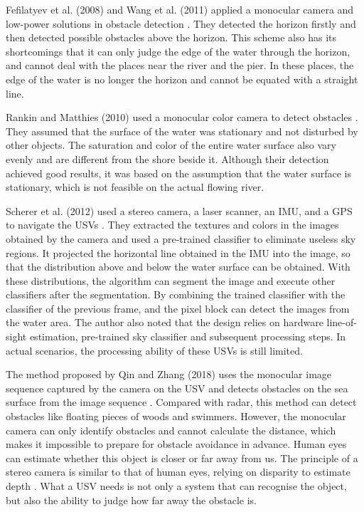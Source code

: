 \documentclass[journal,article,submit,moreauthors,pdftex]{Definitions/mdpi}
\begin{document}
Fefilatyev et al. (2008) and Wang et al. (2011) applied a monocular camera and low-power solutions in obstacle detection \cite{4761344, 6070512}. They detected the horizon firstly and then detected possible obstacles above the horizon. This scheme also has its shortcomings that it can only judge the edge of the water through the horizon, and cannot deal with the places near the river and the pier. In these places, the edge of the water is no longer the horizon and cannot be equated with a straight line.

Rankin and Matthies (2010) used a monocular color camera to detect obstacles \cite{5650402}. They assumed that the surface of the water was stationary and not disturbed by other objects. The saturation and color of the entire water surface also vary evenly and are different from the shore beside it.
Although their detection achieved good results, it was based on the assumption that the water surface is stationary, which is not feasible on the actual flowing river.

Scherer et al. (2012) used a stereo camera, a laser scanner, an IMU, and a GPS to navigate the USVs \cite{scherer_river_2012}. They extracted the textures and colors in the images obtained by the camera and used a pre-trained classifier to eliminate useless sky regions. It projected the horizontal line obtained in the IMU into the image, so that the distribution above and below the water surface can be obtained. With these distributions, the algorithm can segment the image and execute other classifiers after the segmentation. By combining the trained classifier with the classifier of the previous frame, and the pixel block can detect the images from the water area. The author also noted that the design relies on hardware line-of-sight estimation, pre-trained sky classifier and subsequent processing steps. In actual scenarios, the processing ability of these USVs is still limited.


The method proposed by Qin and Zhang (2018) uses the monocular image sequence captured by the camera on the USV and detects obstacles on the sea surface from the image sequence \cite{qin2018robust}. Compared with radar, this method can detect obstacles like floating pieces of woods and swimmers. However, the monocular camera can only identify obstacles and cannot calculate the distance, which makes it impossible to prepare for obstacle avoidance in advance. Human eyes can estimate whether this object is closer or far away from us. The principle of a stereo camera is similar to that of human eyes, relying on disparity to estimate depth \cite{mustafah2012stereo}. What a USV needs is not only a system that can recognise the object, but also the ability to judge how far away the obstacle is.
\end{document}
